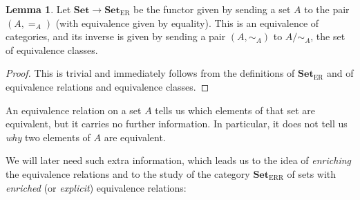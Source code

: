 \documentclass[12pt,a4paper,twoside]{article}
\newlength{\abstand}
\def\Set{{\mathbf{Set}}}
\def\SetER{{\Set_{\text{ER}}}}
\def\SetEER{{\Set_{\text{ERR}}}}
\theoremstyle{definition}
\newtheorem{lemma}[defi]{Lemma}
\begin{document}
\vspace{\abstand}

\begin{lemma}\label{lemmaSetERSet}
    Let $\Set\rightarrow\SetER$ be the functor given by sending a set $A$ to
    the pair $(A,=_A)$ (with equivalence given by equality). This is an
    equivalence of categories, and its inverse is given by sending a pair
    $(A,\sim_A)$ to $A/\sim_A$, the set of equivalence classes.
\end{lemma}

\vspace{\abstand}

\begin{proof}
    This is trivial and immediately follows from the definitions of $\SetER$
    and of equivalence relations and equivalence classes.
\end{proof}

\vspace{\abstand}

An equivalence relation on a set $A$ tells us which elements of that set are
equivalent, but it carries no further information. In particular, it does not
tell us \emph{why} two elements of $A$ are equivalent.

We will later need such extra information, which leads us to the idea of
\emph{enriching} the equivalence relations and to the study of the category
$\SetEER$ of sets with \emph{enriched} (or \emph {explicit}) equivalence
relations:
\end{document}
